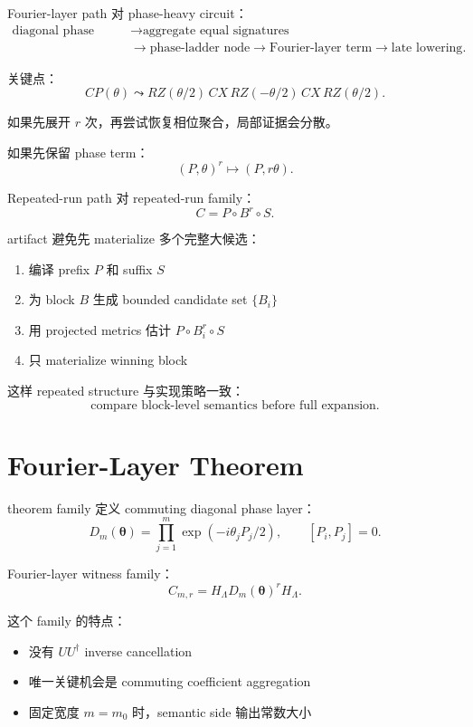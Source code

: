 \documentclass[aspectratio=169,11pt]{ctexbeamer}
\begin{document}
\begin{frame}{Fourier-layer path}
  对 phase-heavy circuit：
  \[
  \begin{aligned}
    \text{diagonal phase span}
    &\to
    \text{aggregate equal signatures} \\
    &\to
    \text{phase-ladder node}
    \to
    \text{Fourier-layer term}
    \to
    \text{late lowering}.
  \end{aligned}
  \]

  关键点：
  \[
    CP(\theta)
    \leadsto
    RZ(\theta/2)\,CX\,RZ(-\theta/2)\,CX\,RZ(\theta/2).
  \]

  如果先展开 $r$ 次，再尝试恢复相位聚合，局部证据会分散。

  如果先保留 phase term：
  \[
    (P,\theta)^r\mapsto(P,r\theta).
  \]
\end{frame}

\begin{frame}{Repeated-run path}
  对 repeated-run family：
  \[
    C=P\circ B^r\circ S.
  \]

  artifact 避免先 materialize 多个完整大候选：

  \begin{enumerate}
    \item 编译 prefix $P$ 和 suffix $S$
    \item 为 block $B$ 生成 bounded candidate set $\{B_i\}$
    \item 用 projected metrics 估计 $P\circ B_i^r\circ S$
    \item 只 materialize winning block
  \end{enumerate}

  这样 repeated structure 与实现策略一致：
  \[
    \text{compare block-level semantics before full expansion}.
  \]
\end{frame}

\section{Fourier-Layer Theorem}

\begin{frame}{theorem family}
  定义 commuting diagonal phase layer：
  \[
    D_m(\bm{\theta})
    =
    \prod_{j=1}^m
    \exp(-i\theta_jP_j/2),
    \qquad
    [P_i,P_j]=0.
  \]

  Fourier-layer witness family：
  \[
    C_{m,r}
    =
    H_{\Lambda}D_m(\bm{\theta})^rH_{\Lambda}.
  \]

  这个 family 的特点：
  \begin{itemize}
    \item 没有 $U U^\dagger$ inverse cancellation
    \item 唯一关键机会是 commuting coefficient aggregation
    \item 固定宽度 $m=m_0$ 时，semantic side 输出常数大小
  \end{itemize}
\end{frame}
\end{document}
